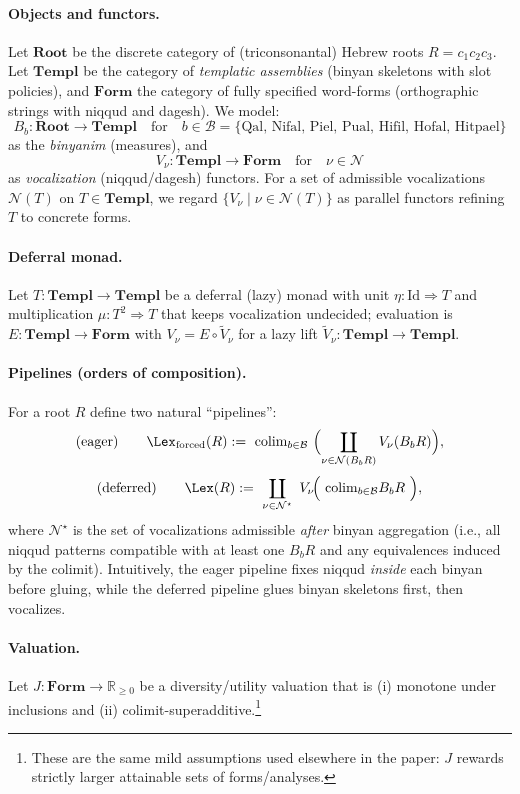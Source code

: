 \documentclass[12pt]{article}
\theoremstyle{remark}
\begin{document}
\paragraph{Objects and functors.}
Let $\mathbf{Root}$ be the discrete category of (triconsonantal) Hebrew roots $R=c_1 c_2 c_3$.
Let $\mathbf{Templ}$ be the category of \emph{templatic assemblies} (binyan skeletons with slot policies), and
$\mathbf{Form}$ the category of fully specified word-forms (orthographic strings with niqqud and dagesh).
We model:
\[
B_b:\mathbf{Root}\to\mathbf{Templ}\quad\text{for}\quad b\in\mathcal{B}=\{\text{Qal, Nifal, Piel, Pual, Hifil, Hofal, Hitpael}\}
\]
as the \emph{binyanim} (measures), and
\[
V_{\nu}:\mathbf{Templ}\to\mathbf{Form}\quad\text{for}\quad \nu\in\mathcal{N}
\]
as \emph{vocalization} (niqqud/dagesh) functors. For a set of admissible vocalizations $\mathcal{N}(T)$ on $T\in\mathbf{Templ}$, we regard $\{V_\nu\mid \nu\in\mathcal{N}(T)\}$ as parallel functors refining $T$ to concrete forms.

\paragraph{Deferral monad.}
Let $T:\mathbf{Templ}\to\mathbf{Templ}$ be a deferral (lazy) monad with unit $\eta:\mathrm{Id}\Rightarrow T$ and multiplication $\mu:T^2\Rightarrow T$ that keeps vocalization undecided; evaluation is $E:\mathbf{Templ}\to\mathbf{Form}$ with $V_\nu=E\circ \widetilde V_\nu$ for a lazy lift $\widetilde V_\nu:\mathbf{Templ}\to\mathbf{Templ}$.

\paragraph{Pipelines (orders of composition).}
For a root $R$ define two natural “pipelines”:
\[
\text{(eager)}\qquad
\Lex_{\mathrm{forced}}(R)
:=\ \mathrm{colim}_{b\in\mathcal{B}}\ \Big(\!\coprod_{\nu\in\mathcal{N}(B_b R)} V_\nu(B_b R)\Big),
\]
\[
\text{(deferred)}\qquad
\Lex(R)
:=\ \coprod_{\nu\in\mathcal{N}^\star}\ V_\nu\!\Big(\ \mathrm{colim}_{b\in\mathcal{B}} B_b R\ \Big),
\]
where $\mathcal{N}^\star$ is the set of vocalizations admissible \emph{after} binyan aggregation (i.e., all niqqud patterns compatible with at least one $B_b R$ and any equivalences induced by the colimit). Intuitively, the eager pipeline fixes niqqud \emph{inside} each binyan before gluing, while the deferred pipeline glues binyan skeletons first, then vocalizes.

\paragraph{Valuation.}
Let $J:\mathbf{Form}\to\mathbb{R}_{\ge 0}$ be a diversity/utility valuation that is (i) monotone under inclusions and (ii) colimit-superadditive.\footnote{These are the same mild assumptions used elsewhere in the paper: $J$ rewards strictly larger attainable sets of forms/analyses.}
\end{document}

